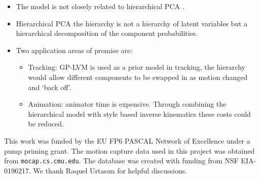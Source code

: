 \documentclass[english,color,smalltitle]{manchesterposter}
\begin{document}
\begin{multicols}{5}{\LARGE \par}
\begin{columnbox}
\-


\begin{itemize}
\item The model is not closely related to hierarchical PCA \citep{Bishop:hierarchy98}.{\large \par}
\item Hierarchical PCA the hierarchy is not a hierarchy of latent variables
but a hierarchical decomposition of the component probabilities.{\large \par}
\end{itemize}
\end{columnbox}


\begin{columnbox}
\-


\begin{itemize}
\item Two application areas of promise are:{\large \par}

\begin{itemize}
\item Tracking: GP-LVM is used as a prior model in tracking, the hierarchy
would allow different components to be swapped in as motion changed
and `back off'. {\large \par}
\item Animation: animator time is expensive. Through combining the hierarchical
model with style based inverse kinematics \citep{Grochow:styleik04}
these costs could be reduced. {\large \par}
\end{itemize}
\end{itemize}
\end{columnbox}


\begin{columnbox}
\-


{\footnotesize This work was funded by the EU FP6 PASCAL Network of
Excellence under a pump priming grant. The motion capture data used
in this project was obtained from }\texttt{\footnotesize mocap.cs.cmu.edu}{\footnotesize .
The database was created with funding from NSF EIA-0196217. We thank
Raquel Urtasun for helpful discussions.}{\footnotesize \par}


\end{columnbox}
\end{multicols}
\end{document}
